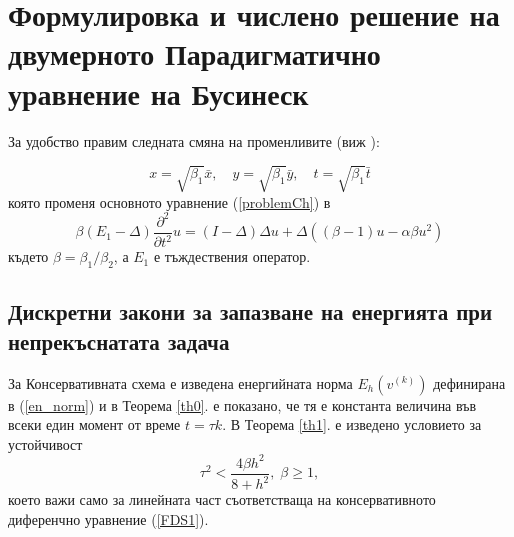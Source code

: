 \documentclass[a4paper]{article}
\newcommand{\be}{\begin{equation}}
\newcommand{\ee}{\end{equation}}
\newcommand{\rf}[1]{(\ref{#1})}
\theoremstyle{remark}
\begin{document}
\bigskip


\section{Формулировка и числено решение на двумерното Парадигматично уравнение на Бусинеск}\label{hiperbolicFormulation}

За удобство правим следната смяна на променливите (виж \cite{ref25}):

\be\label{vcHyp}
x = \sqrt{\beta_1} \bar{x}, \quad y = \sqrt{\beta_1} \bar{y}, \quad t = \sqrt{\beta_1} \bar{t} 
\ee
която променя основното уравнение \rf{problemCh} в
\be\label{problemVC}
 \beta (E_1-\Delta) \frac{\partial^2}{\partial t^2}u= 
(I-\Delta)\Delta u +\Delta( (\beta - 1 )u - \alpha \beta u^2 )
\ee
където $\beta = \beta_1/\beta_2$, а $E_1$ е тъждествения оператор. 

\subsection{Дискретни закони за запазване на енергията при непрекъснатата задача}\label{discreteLawsEn}
За Консервативната схема е изведена енергийната норма $E_h(v^{(k)})$ дефинирана в \rf{en_norm} и в Теорема \ref{th0}. е показано, че тя е константа величина във всеки един момент от време $t=\tau k$. В Теорема \ref{th1}. е изведено условието за устойчивост
\be
\tau^2 < \frac{ 4 \beta h^2 } { 8 + h^2}, \; \beta \ge 1,
\ee 
което важи само за линейната част съответстваща на консервативното диференчно уравнение \rf{FDS1}.
\end{document}
